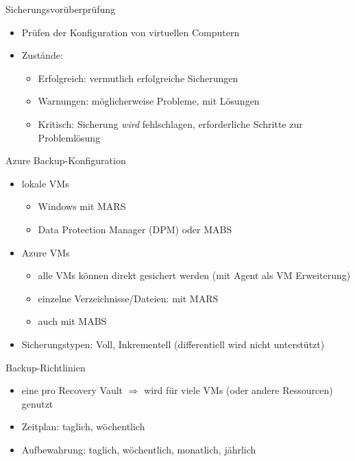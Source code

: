 \begin{flashcard}[Definition]{Sicherungsvorüberprüfung}
  \begin{itemize}
    \item Prüfen der Konfiguration von virtuellen Computern
    \item Zustände:
      \begin{itemize}
        \item Erfolgreich: vermutlich erfolgreiche Sicherungen
        \item Warnungen: möglicherweise Probleme, mit Lösungen
        \item Kritisch: Sicherung \emph{wird} fehlschlagen, erforderliche Schritte zur Problemlösung
      \end{itemize}
  \end{itemize}
\end{flashcard}

\begin{flashcard}[Definition]{Azure Backup-Konfiguration}
  \begin{itemize}
    \item lokale VMs
      \begin{itemize}
        \item Windows mit MARS
        \item Data Protection Manager (DPM) oder MABS
      \end{itemize}
    \item Azure VMs
      \begin{itemize}
        \item alle VMs können direkt gesichert werden (mit Agent als VM Erweiterung)
        \item einzelne Verzeichnisse/Dateien: mit MARS
        \item auch mit MABS
      \end{itemize}
    \item Sicherungstypen: Voll, Inkrementell (differentiell wird nicht unterstützt)
  \end{itemize}
\end{flashcard}

\begin{flashcard}[Definition]{Backup-Richtlinien}
  \begin{itemize}
    \item eine pro Recovery Vault\newline
      $\Rightarrow$ wird für viele VMs (oder andere Ressourcen) genutzt
    \item Zeitplan: taglich, wöchentlich
    \item Aufbewahrung: taglich, wöchentlich, monatlich, jährlich
  \end{itemize}
\end{flashcard}

